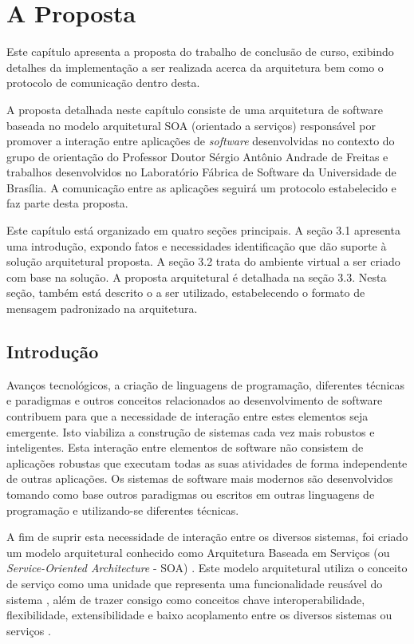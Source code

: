 \chapter[A Proposta]{A Proposta}

Este capítulo apresenta a proposta do trabalho de conclusão de curso, exibindo detalhes da implementação a ser realizada acerca da arquitetura bem como o protocolo de comunicação dentro desta.

A proposta detalhada neste capítulo consiste de uma arquitetura de software baseada no modelo arquitetural SOA (orientado a serviços) responsável por promover a interação entre aplicações de \textit{software} desenvolvidas no contexto do grupo de orientação do Professor Doutor Sérgio Antônio Andrade de Freitas e trabalhos desenvolvidos no Laboratório Fábrica de Software da Universidade de Brasília. A comunicação entre as aplicações seguirá um protocolo estabelecido e faz parte desta proposta.

Este capítulo está organizado em quatro seções principais. A seção 3.1 apresenta uma introdução, expondo fatos e necessidades identificação que dão suporte à solução arquitetural proposta. A seção 3.2 trata do ambiente virtual a ser criado com base na solução. A proposta arquitetural é detalhada na seção 3.3. Nesta seção, também está descrito o a ser utilizado, estabelecendo o formato de mensagem padronizado na arquitetura.

\section{Introdução}
Avanços tecnológicos, a criação de linguagens de programação, diferentes técnicas e paradigmas e outros conceitos relacionados ao desenvolvimento de software contribuem para que a necessidade de interação entre estes elementos seja emergente. Isto viabiliza a construção de sistemas cada vez mais robustos e inteligentes. Esta interação entre elementos de software não consistem de aplicações robustas que executam todas as suas atividades de forma independente de outras aplicações. Os sistemas de software mais modernos são desenvolvidos tomando como base outros paradigmas ou escritos em outras linguagens de programação e utilizando-se diferentes técnicas.

A fim de suprir esta necessidade de interação entre os diversos sistemas, foi criado um modelo arquitetural conhecido como Arquitetura Baseada em Serviços (ou \textit{Service-Oriented Architecture} - SOA) \cite{linthicum_soainrealworld_2007}. Este modelo arquitetural utiliza o conceito de serviço como uma unidade que representa uma funcionalidade reusável do sistema \cite{lewis_getting_2010}, além de trazer consigo como conceitos chave interoperabilidade, flexibilidade, extensibilidade e baixo acoplamento entre os diversos sistemas ou serviços \cite{josuttis_soa_2007}.

